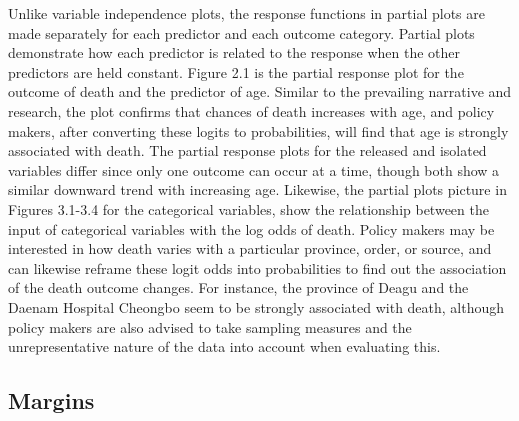 \documentclass[
]{article}
\begin{document}
Unlike variable independence plots, the response functions in partial
plots are made separately for each predictor and each outcome category.
Partial plots demonstrate how each predictor is related to the response
when the other predictors are held constant. Figure 2.1 is the partial
response plot for the outcome of death and the predictor of age. Similar
to the prevailing narrative and research, the plot confirms that chances
of death increases with age, and policy makers, after converting these
logits to probabilities, will find that age is strongly associated with
death. The partial response plots for the released and isolated
variables differ since only one outcome can occur at a time, though both
show a similar downward trend with increasing age. Likewise, the partial
plots picture in Figures 3.1-3.4 for the categorical variables, show the
relationship between the input of categorical variables with the log
odds of death. Policy makers may be interested in how death varies with
a particular province, order, or source, and can likewise reframe these
logit odds into probabilities to find out the association of the death
outcome changes. For instance, the province of Deagu and the Daenam
Hospital Cheongbo seem to be strongly associated with death, although
policy makers are also advised to take sampling measures and the
unrepresentative nature of the data into account when evaluating this.

\hypertarget{margins}{%
\subsection{Margins}\label{margins}}
\end{document}
